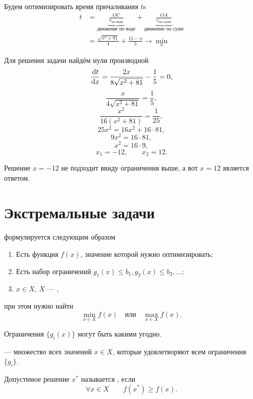\bigskip

\solution

Будем оптимизировать время причаливания $t$s
\begin{align*}
	t &= \underbrace{\frac{OC}{v_{\text{по воде}}}}_{\text{движение по воде}} + \underbrace{\frac{OA}{v_{\text{по суше}}}}_{\text{движение по суше}} \\
	&= \boxed{\frac{\sqrt{x^2+81}}{4} + \frac{15 - x}{5} \to \min_x}
\end{align*}

Для решения задачи найдём нули производной
\[\derivative{t}{x} = \frac{2x}{8\sqrt{x^2+81}} - \frac{1}{5} = 0,\]
\[\frac{x}{4\sqrt{x^2+81}} = \frac{1}{5},\]
\[\frac{x^2}{16(x^2 + 81)} = \frac{1}{25},\]
\[25x^2 = 16x^2 + 16 \cdot 81,\]
\[9x^2 = 16 \cdot 81,\]
\[x^2 = 16 \cdot 9,\]
\[x_1 = -12, \qquad x_2 = 12.\]

Решение $x = -12$ не подходит ввиду ограничения выше, а вот $\boxed{x = 12}$ является ответом.

\section{Экстремальные задачи}


 формулируется следующим образом

\begin{enumerate}[nosep]
	\item Есть функция $f(x)$, значение которой нужно оптимизировать;
	
	\item Есть набор ограничений $g_1(x) \le b_1, g_2(x) \le b_2, \dots$;
	
	\item $x \in X$, $X$ --- ,
\end{enumerate}

при этом нужно найти
\[\min_{x \in X} f(x) \quad \text{или} \quad \max_{x \in X} f(x).\]

\remark

Ограничения $\{g_i(x)\}$ могут быть какими угодно.


 --- множество всех значений $x \in X$, которые удовлетворяют всем ограничения $\{g_i\}$.


Допустимое решение $x^*$ называется , если
\[\forall x \in X \qquad f(x^*) \ge f(x).\]

